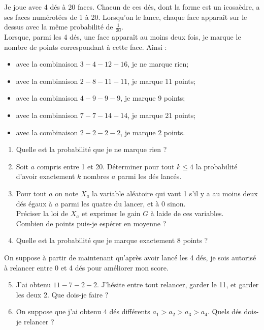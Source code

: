 \documentclass[landscape,twocolumn,leqno,a4paper,10pt]{report} %
\newcommand\n{\noindent}
\renewcommand{\leq}{\leqslant}
\begin{document}
\n Je joue avec 4 dés à 20 faces. Chacun de ces dés, dont la forme est un icosaèdre, a ses faces numérotées de 1 à 20. Lorsqu'on le lance, chaque face apparaît sur le dessus avec la même probabilité de $\frac{1}{20}$.\\
Lorsque, parmi les 4 dés, une face apparaît au moins deux fois, je marque le nombre de points correspondant à cette face. Ainsi :

\begin{itemize}
	\item avec la combinaison $3-4-12-16$, je ne marque rien;
	\item avec la combinaison $2-8-11-11$, je marque 11 points;
	\item avec la combinaison $4-9-9-9$, je marque 9 points;
	\item avec la combinaison $7-7-14-14$, je marque 21 points;
	\item avec la combinaison $2-2-2-2$, je marque 2 points.
\end{itemize}

\begin{enumerate}
	\item Quelle est la probabilité que je ne marque rien ?
	\item Soit $a$ compris entre 1 et 20. Déterminer pour tout $k \leq 4$ la probabilité d'avoir exactement $k$ nombres $a$ parmi les dés lancés.
	\item Pour tout $a$ on note $X_{a}$ la variable aléatoire qui vaut 1 s'il y a au moins deux dés égaux à $a$ parmi les quatre du lancer, et à 0 sinon.\\
	Préciser la loi de $X_{a}$ et exprimer le gain $G$ à laide de ces variables.\\
	Combien de points puis-je espérer en moyenne ? 
	\item Quelle est la probabilité que je marque exactement 8 points ?
\end{enumerate}

\n On suppose à partir de maintenant qu'après avoir lancé les 4 dés, je sois autorisé à relancer entre 0 et 4 dés pour améliorer mon score.

\begin{enumerate}\setcounter{enumi}{4}
	\item J'ai obtenu $11-7-2-2$. J'hésite entre tout relancer, garder le 11, et garder les deux 2. Que dois-je faire ?
	\item On suppose que j'ai obtenu 4 dés différents $a_{1}>a_{2}>a_{3}>a_{4}$. Quels dés dois-je relancer ?
\end{enumerate}
\end{document}
